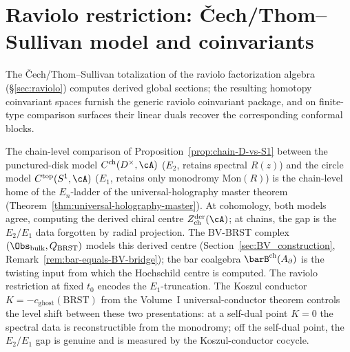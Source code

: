 \section{Raviolo restriction: Čech/Thom--Sullivan model and coinvariants}
\label{sec:raviolo-expanded}

The \v{C}ech/Thom--Sullivan totalization of the raviolo factorization algebra (\S\ref{sec:raviolo}) computes derived global sections; the resulting homotopy coinvariant spaces furnish the generic raviolo coinvariant package, and on finite-type comparison surfaces their linear duals recover the corresponding conformal blocks.

\begin{remark}
\label{rem:raviolo-D-S1-universal-holography}
The chain-level comparison of Proposition~\ref{prop:chain-D-vs-S1} between
the punctured-disk model $C^{\mathrm{ch}}(D^\times,\cA)$ ($E_2$, retains
spectral $R(z)$) and the circle model $C^{\mathrm{top}}(S^1,\cA)$ ($E_1$,
retains only monodromy $\mathrm{Mon}(R)$) is the chain-level home of the
$E_n$-ladder of the universal-holography master theorem
(Theorem~\ref{thm:universal-holography-master}).
At cohomology, both models agree, computing the derived chiral centre
$Z^{\mathrm{der}}_{\mathrm{ch}}(\cA)$; at chains, the gap is the
$E_2/E_1$ data forgotten by radial projection. The BV-BRST complex
$(\Obs_{\mathrm{bulk}}, Q_{\mathrm{BRST}})$ models this derived centre
(Section~\ref{sec:BV_construction},
Remark~\ref{rem:bar-equals-BV-bridge}); the bar coalgebra
$\barB^{\mathrm{ch}}(A_\partial)$ is the twisting input from which the
Hochschild centre is computed. The raviolo restriction at fixed $t_0$
encodes the $E_1$-truncation. The
Koszul conductor $K = -c_{\mathrm{ghost}}(\mathrm{BRST})$
from the Volume~I universal-conductor theorem controls the level shift
between these two presentations: at a self-dual point $K=0$ the spectral
data is reconstructible from the monodromy; off the self-dual point, the
$E_2/E_1$ gap is genuine and is measured by the Koszul-conductor cocycle.
\end{remark}

